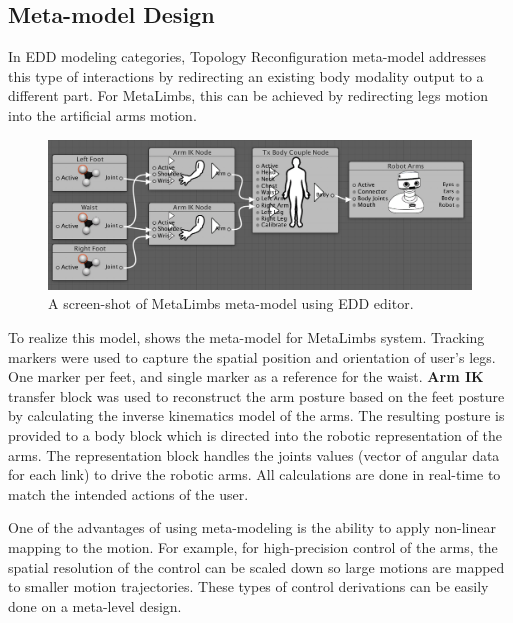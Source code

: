 \subsection{Meta-model Design}


In EDD modeling categories, Topology Reconfiguration meta-model addresses this type of interactions by redirecting an existing body modality output to a different part. For MetaLimbs, this can be achieved by redirecting legs motion into the artificial arms motion.


\begin{figure}[t!]
  \centering
	  \includegraphics[width=1\linewidth]{figures/eval/MetaLimbs/MetaLimbs_EDD.png}
  \captionsetup{justification=centering}
  \caption{A screen-shot of MetaLimbs meta-model using EDD editor.}
  \label{fig:eval-metalimbs-EDD}
\end{figure}

To realize this model,  shows the meta-model for MetaLimbs system. Tracking markers were used to capture the spatial position and orientation of user's legs. One marker per feet, and single marker as a reference for the waist. \textbf{Arm IK} transfer block was used to reconstruct the arm posture based on the feet posture by calculating the inverse kinematics model of the arms. The resulting posture is provided to a body block which is directed into the robotic representation of the arms. The representation block handles the joints values (vector of angular data for each link) to drive the robotic arms. All calculations are done in real-time to match the intended actions of the user.

One of the advantages of using meta-modeling is the ability to apply non-linear mapping to the motion. For example, for high-precision control of the arms, the spatial resolution of the control can be scaled down so large motions are mapped to smaller motion trajectories. These types of control derivations can be easily done on a meta-level design.



